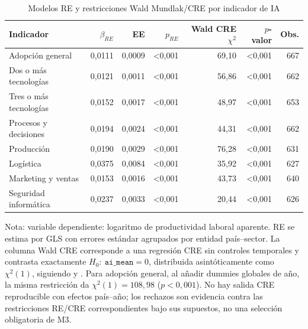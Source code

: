 \documentclass[12pt,a4paper]{article}
\begin{document}
\begin{table}[H]
\centering
\caption{Modelos RE y restricciones Wald Mundlak/CRE por indicador de IA}
\label{tab:anexo-re-hausman}
\small
\begin{tabular}{lrrrrrr}
\toprule
\textbf{Indicador} & \textbf{$\beta_{RE}$} & \textbf{EE} & \textbf{$p_{RE}$} & \textbf{Wald CRE $\chi^2$} & \textbf{$p$-valor} & \textbf{Obs.} \\
\midrule
Adopción general & 0,0111 & 0,0009 & <0,001 & 69,10 & <0,001 & 667 \\
Dos o más tecnologías & 0,0121 & 0,0011 & <0,001 & 56,86 & <0,001 & 662 \\
Tres o más tecnologías & 0,0152 & 0,0017 & <0,001 & 48,97 & <0,001 & 653 \\
Procesos y decisiones & 0,0194 & 0,0024 & <0,001 & 44,31 & <0,001 & 662 \\
Producción & 0,0190 & 0,0029 & <0,001 & 76,28 & <0,001 & 631 \\
Logística & 0,0375 & 0,0084 & <0,001 & 35,92 & <0,001 & 627 \\
Marketing y ventas & 0,0153 & 0,0016 & <0,001 & 43,73 & <0,001 & 640 \\
Seguridad informática & 0,0237 & 0,0033 & <0,001 & 20,44 & <0,001 & 626 \\
\bottomrule
\end{tabular}
\begin{flushleft}
\footnotesize Nota: variable dependiente: logaritmo de productividad laboral aparente. RE se estima por GLS con errores estándar agrupados por entidad país--sector. La columna Wald CRE corresponde a una regresión CRE sin controles temporales y contrasta exactamente $H_0:\ \texttt{ai\_mean}=0$, distribuida asintóticamente como $\chi^2(1)$, siguiendo \citet{mundlak1978pooling} y \citet{wooldridge2010econometric}. Para adopción general, al añadir dummies globales de año, la misma restricción da $\chi^2(1)=108,98$ ($p<0,001$). No hay salida CRE reproducible con efectos país--año; los rechazos son evidencia contra las restricciones RE/CRE correspondientes bajo sus supuestos, no una selección obligatoria de M3.
\end{flushleft}
\end{table}
\end{document}

